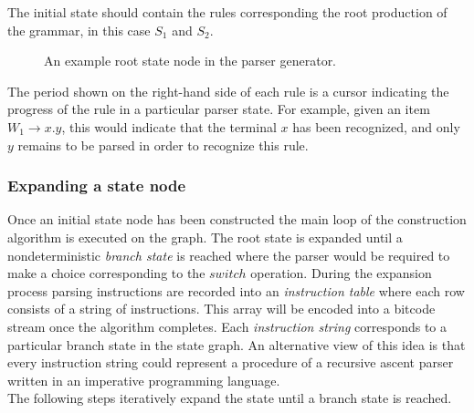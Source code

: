 \documentclass[a4paper,11pt]{article}
\begin{document}
The initial state should contain the rules corresponding the root production of the grammar, in this case $S_1$ and $S_2$.\\

\begin{figure}[!ht]
\centering
{}
\caption{An example root state node in the parser generator.}
\end{figure}

The period shown on the right-hand side of each rule is a cursor indicating the progress of the rule in a particular parser state.
For example, given an item $W_1 \rightarrow x . y$, this would indicate that the terminal $x$ has been recognized, and only $y$ remains to be parsed in order to recognize this rule.\\

\subsubsection{Expanding a state node}
Once an initial state node has been constructed the main loop of the construction algorithm is executed on the graph.
The root state is expanded until a nondeterministic \emph{branch state} is reached where the parser would be required to make a choice corresponding to the $switch$ operation.
During the expansion process parsing instructions are recorded into an \emph{instruction table} where each row consists of a string of instructions.
This array will be encoded into a bitcode stream once the algorithm completes.
Each \emph{instruction string} corresponds to a particular branch state in the state graph.
An alternative view of this idea is that every instruction string could represent a procedure of a recursive ascent parser written in an imperative programming language.\\

The following steps iteratively expand the state until a branch state is reached.
\end{document}
